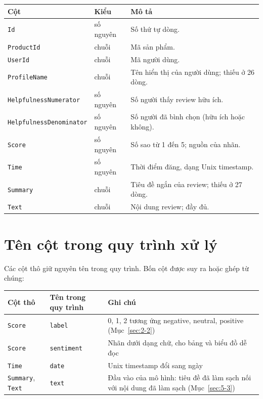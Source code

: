 \begin{center}
\begin{tabular}{@{}p{4.6cm}p{2cm}p{8cm}@{}}
    \toprule
    Cột & Kiểu & Mô tả \\
    \midrule
    \texttt{Id} & số nguyên & Số thứ tự dòng. \\
    \texttt{ProductId} & chuỗi & Mã sản phẩm. \\
    \texttt{UserId} & chuỗi & Mã người dùng. \\
    \texttt{ProfileName} & chuỗi & Tên hiển thị của người dùng; thiếu ở 26 dòng. \\
    \texttt{HelpfulnessNumerator} & số nguyên & Số người thấy review hữu ích. \\
    \texttt{HelpfulnessDenominator} & số nguyên & Số người đã bình chọn (hữu ích hoặc không). \\
    \texttt{Score} & số nguyên & Số sao từ 1 đến 5; nguồn của nhãn. \\
    \texttt{Time} & số nguyên & Thời điểm đăng, dạng Unix timestamp. \\
    \texttt{Summary} & chuỗi & Tiêu đề ngắn của review; thiếu ở 27 dòng. \\
    \texttt{Text} & chuỗi & Nội dung review; đầy đủ. \\
    \bottomrule
\end{tabular}
\end{center}

\section{Tên cột trong quy trình xử lý}
\label{sec:3-4}

Các cột thô giữ nguyên tên trong quy trình. Bốn cột được suy ra hoặc ghép từ chúng:

\begin{center}
\begin{tabular}{@{}p{3.6cm}p{2.6cm}p{8.2cm}@{}}
    \toprule
    Cột thô & Tên trong quy trình & Ghi chú \\
    \midrule
    \texttt{Score} & \texttt{label} & 0, 1, 2 tương ứng negative, neutral, positive (Mục~\ref{sec:2-2}) \\
    \texttt{Score} & \texttt{sentiment} & Nhãn dưới dạng chữ, cho bảng và biểu đồ dễ đọc \\
    \texttt{Time} & \texttt{date} & Unix timestamp đổi sang ngày \\
    \texttt{Summary}, \texttt{Text} & \texttt{text} & Đầu vào của mô hình: tiêu đề đã làm sạch nối với nội dung đã làm sạch (Mục~\ref{sec:5-3}) \\
    \bottomrule
\end{tabular}
\end{center}

